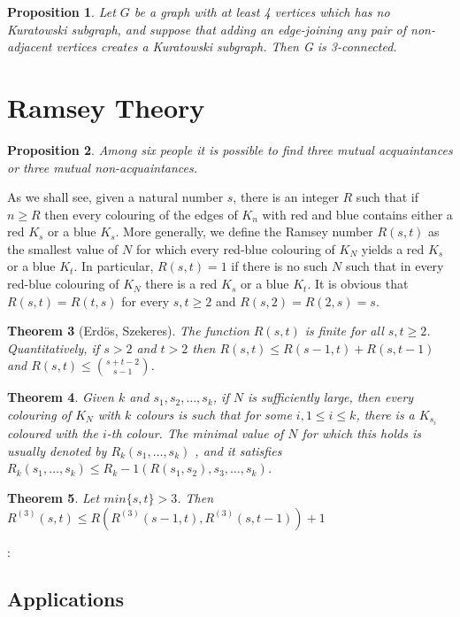 \documentclass[10pt, fleqn, a4paper, landscape]{article}
\theoremstyle{plain} %
\newtheorem{thm}{Theorem}
\newtheorem{pro}[thm]{Proposition}
\theoremstyle{remark} %
\theoremstyle{definition} %
\begin{document}
\begin{multicols}{3}
\begin{tiny}
\begin{pro}
Let $G$ be a graph with at least 4 vertices which has no Kuratowski subgraph, and suppose that adding an edge-joining any pair of non-adjacent vertices creates a Kuratowski subgraph.
Then G is 3-connected.
\end{pro}

\section{Ramsey Theory}

\begin{pro}
Among six people it is possible to find three mutual acquaintances or three mutual non-acquaintances.
\end{pro}

As we shall see, given a natural number $s$, there is an integer $R$ such that if $n \ge R$ then every colouring of the edges of $K_n$ with red and blue contains either a red $K_s$ or a blue $K_s$. More generally, we define the Ramsey number $R(s, t)$ as the smallest value of $N$ for which every red-blue colouring of $K_N$ yields a red $K_s$ or a blue $K_t$. In particular, $R(s, t) = 1$ if there is no such $N$ such that in every red-blue
colouring of $K_N$ there is a red $K_s$ or a blue $K_t$. It is obvious that
$ R(s, t) = R(t, s)$ for every $s, t \ge 2$ and $R(s, 2) = R(2, s) = s$. 

\begin{thm}[Erdös, Szekeres]
The function $R(s, t)$ is finite for all $s, t \ge 2$. Quantitatively, if $s > 2 $ and $t > 2$ then $R(s, t)\le R(s - 1, t) + R(s, t - 1)$ and $R(s, t) \le \binom{s+t-2}{s-1}$.
\end{thm}

\begin{thm}
Given $k$ and $s_1, s_2, \dots , s_k$, if $N$ is sufficiently large, then every colouring of $K_N$ with $k$ colours is such that for some $i, 1 \le i \le k$, there is a $K_{s_i}$ coloured with the $i$-th colour. The
minimal value of $N$ for which this holds is usually denoted by $R_k(s_1, \dots , s_k)$ , and it satisfies $R_k(s_1, \dots , s_k)\le R_k-1(R(s_1, s_2), s_3, \dots , s_k)$.
\end{thm}

\begin{thm}
Let $min\{s, t\} > 3$. Then
$R^{(3)}(s, t) \le R(R^{(3)}(s - 1, t),R^{(3)}(s, t - 1)) + 1$
\end{thm}:

\subsection{Applications}


\end{tiny}
\end{multicols}
\end{document}
